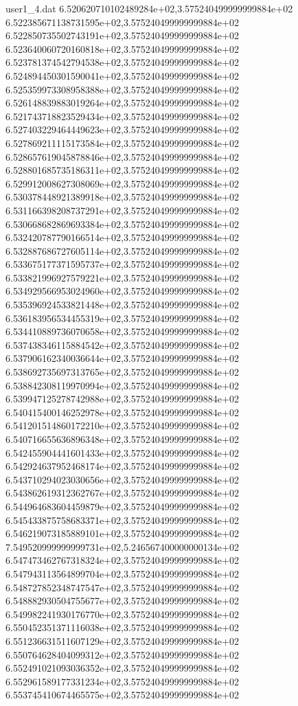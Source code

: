 \begin{filecontents}{user1_4.dat}
6.520620710102489284e+02,3.575240499999999884e+02
6.522385671138731595e+02,3.575240499999999884e+02
6.522850735502743191e+02,3.575240499999999884e+02
6.523640060720160818e+02,3.575240499999999884e+02
6.523781374542794538e+02,3.575240499999999884e+02
6.524894450301590041e+02,3.575240499999999884e+02
6.525359973308958388e+02,3.575240499999999884e+02
6.526148839883019264e+02,3.575240499999999884e+02
6.521743718823529434e+02,3.575240499999999884e+02
6.527403229464449623e+02,3.575240499999999884e+02
6.527869211115173584e+02,3.575240499999999884e+02
6.528657619045878846e+02,3.575240499999999884e+02
6.528801685735186311e+02,3.575240499999999884e+02
6.529912008627308069e+02,3.575240499999999884e+02
6.530378448921389918e+02,3.575240499999999884e+02
6.531166398208737291e+02,3.575240499999999884e+02
6.530668682869693384e+02,3.575240499999999884e+02
6.532420787790166514e+02,3.575240499999999884e+02
6.532887686727605114e+02,3.575240499999999884e+02
6.533675177371595737e+02,3.575240499999999884e+02
6.533821996927579221e+02,3.575240499999999884e+02
6.534929566953024960e+02,3.575240499999999884e+02
6.535396924533821448e+02,3.575240499999999884e+02
6.536183956534455319e+02,3.575240499999999884e+02
6.534410889736070658e+02,3.575240499999999884e+02
6.537438346115884542e+02,3.575240499999999884e+02
6.537906162340036644e+02,3.575240499999999884e+02
6.538692735697313765e+02,3.575240499999999884e+02
6.538842308119970994e+02,3.575240499999999884e+02
6.539947125278742988e+02,3.575240499999999884e+02
6.540415400146252978e+02,3.575240499999999884e+02
6.541201514860172210e+02,3.575240499999999884e+02
6.540716655636896348e+02,3.575240499999999884e+02
6.542455904441601433e+02,3.575240499999999884e+02
6.542924637952468174e+02,3.575240499999999884e+02
6.543710294023030656e+02,3.575240499999999884e+02
6.543862619312362767e+02,3.575240499999999884e+02
6.544964683604459879e+02,3.575240499999999884e+02
6.545433875758683371e+02,3.575240499999999884e+02
6.546219073185889101e+02,3.575240499999999884e+02
7.549520999999999731e+02,5.246567400000000134e+02
6.547473462767318324e+02,3.575240499999999884e+02
6.547943113564899704e+02,3.575240499999999884e+02
6.548727852348747547e+02,3.575240499999999884e+02
6.548882930504755677e+02,3.575240499999999884e+02
6.549982241930176770e+02,3.575240499999999884e+02
6.550452351371116038e+02,3.575240499999999884e+02
6.551236631511607129e+02,3.575240499999999884e+02
6.550764628404099312e+02,3.575240499999999884e+02
6.552491021093036352e+02,3.575240499999999884e+02
6.552961589177331234e+02,3.575240499999999884e+02
6.553745410674465575e+02,3.575240499999999884e+02

\end{filecontents}
